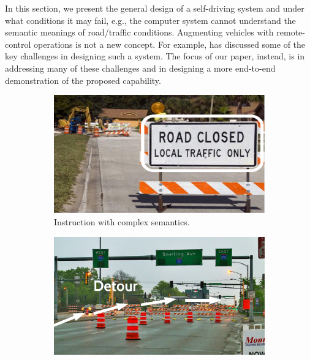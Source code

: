 
In this section, we present the general design of a self-driving system and
under what conditions it may fail, e.g., the computer system cannot 
understand the semantic meanings of road/traffic conditions. 
Augmenting vehicles with remote-control operations is not a new 
concept. For example, \cite{kang2018rc} has discussed some of the key challenges
in designing such a system. The focus of our paper, instead, is in addressing
many of these challenges and in designing a more end-to-end demonstration
of the proposed capability.



\begin{figure}[ht]
\centering
  \begin{subfigure}[t]{0.33\textwidth}
    \includegraphics[width=\linewidth]{Figs/RTDrive/motivation/local_traffic.jpeg}
    \vspace{-0.2cm}
    \caption{Instruction with complex semantics.}
    \label{motivation:local_traffic}
  \end{subfigure}%
 \begin{subfigure}[t]{0.33\textwidth}
    \includegraphics[width=\linewidth]{Figs/RTDrive/motivation/detour.jpg}

\end{subfigure}
\end{figure}
